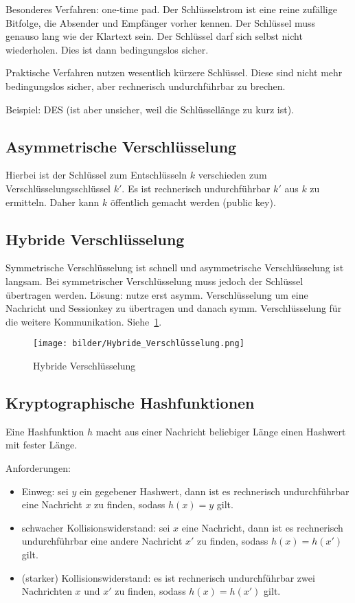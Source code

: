 Besonderes Verfahren: one-time pad.
Der Schlüsselstrom ist eine reine zufällige Bitfolge, die Absender und Empfänger vorher
kennen.
Der Schlüssel muss genauso lang wie der Klartext sein.
Der Schlüssel darf sich selbst nicht wiederholen.
Dies ist dann bedingungslos sicher.

Praktische Verfahren nutzen wesentlich kürzere Schlüssel.
Diese sind nicht mehr bedingungslos sicher, aber rechnerisch undurchführbar zu brechen.

Beispiel: DES (ist aber unsicher, weil die Schlüssellänge zu kurz ist).

\subsection{Asymmetrische Verschlüsselung}%
\label{sub:asymmetrische_verschlusselung}

Hierbei ist der Schlüssel zum Entschlüsseln $k$ verschieden zum Verschlüsselungsschlüssel
$k'$.
Es ist rechnerisch undurchführbar $k'$ aus $k$ zu ermitteln.
Daher kann $k$ öffentlich gemacht werden (public key).

\subsection{Hybride Verschlüsselung}%
\label{sub:hybride_verschlusselung}

Symmetrische Verschlüsselung ist schnell und asymmetrische Verschlüsselung ist langsam.
Bei symmetrischer Verschlüsselung muss jedoch der Schlüssel übertragen werden.
Lösung: nutze erst asymm. Verschlüsselung um eine Nachricht und Sessionkey zu übertragen
und danach symm. Verschlüsselung für die weitere Kommunikation.
Siehe~\ref{fig:Hybride_Verschlüsselung}.

\begin{figure}[h]
  \centering
  \texttt{[image: bilder/Hybride\_Verschlüsselung.png]}
  \caption{Hybride Verschlüsselung}
  \label{fig:Hybride_Verschlüsselung}
\end{figure}

\subsection{Kryptographische Hashfunktionen}%
\label{sub:kryptographische_hashfunktionen}

Eine Hashfunktion $h$ macht aus einer Nachricht beliebiger Länge einen Hashwert mit fester
Länge.

Anforderungen:
\begin{itemize}
  \item Einweg: sei $y$ ein gegebener Hashwert, dann ist es rechnerisch undurchführbar
    eine Nachricht $x$ zu finden, sodass $h(x) = y$ gilt.
  \item schwacher Kollisionswiderstand: sei $x$ eine Nachricht, dann ist es rechnerisch
    undurchführbar eine andere Nachricht $x'$ zu finden, sodass $h(x) = h(x')$ gilt.
  \item (starker) Kollisionswiderstand: es ist rechnerisch undurchführbar zwei Nachrichten
    $x$ und $x'$ zu finden, sodass $h(x) = h(x')$ gilt.
\end{itemize}

